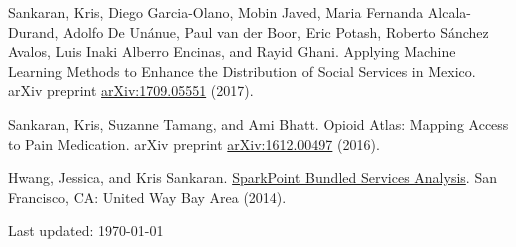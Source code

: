 \documentclass[letterpaper]{article}
\def\footerlink{}
\renewenvironment{itemize}{
  \begin{list}{}{
    \setlength{\leftmargin}{1.5em}
  }
}{
  \end{list}
}
\begin{document}
\begin{itemize}
\item Sankaran, Kris, Diego Garcia-Olano, Mobin Javed, Maria Fernanda
  Alcala-Durand, Adolfo De Unánue, Paul van der Boor, Eric Potash, Roberto
  S\'anchez Avalos, Luis Inaki Alberro Encinas, and Rayid Ghani. Applying
  Machine Learning Methods to Enhance the Distribution of Social Services in
  Mexico. arXiv preprint \href{https://arxiv.org/abs/1709.05551}{arXiv:1709.05551} (2017).
\item Sankaran, Kris, Suzanne Tamang, and Ami Bhatt. Opioid Atlas: Mapping
  Access to Pain Medication. arXiv preprint
  \href{https://arxiv.org/abs/1612.00497}{arXiv:1612.00497} (2016). \item Hwang,
  Jessica, and Kris Sankaran.
\href{https://uwba.org/wp-content/uploads/2022/04/UnitedWay_BayArea_2014_SparkPoint_Bundle_Services_FINAL.pdf}{SparkPoint
Bundled Services Analysis}. San Francisco, CA: United Way Bay Area (2014).
\end{itemize}


\begin{center}
  \begin{footnotesize}
    Last updated: \today \\
    \href{\footerlink}{\texttt{\footerlink}}
  \end{footnotesize}
\end{center}
\end{document}
